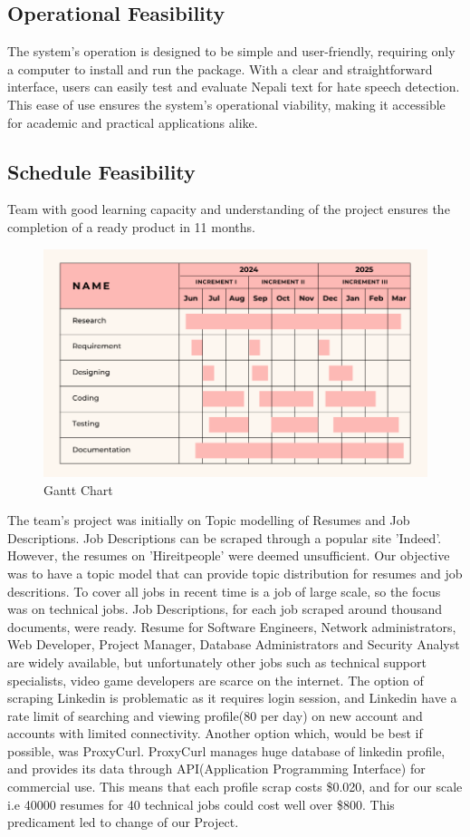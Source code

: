 \subsection{Operational Feasibility}
The system's operation is designed to be simple and user-friendly, requiring only a computer to install and run the package. With a clear and straightforward interface, users can easily test and evaluate Nepali text for hate speech detection. This ease of use ensures the system's operational viability, making it accessible for academic and practical applications alike.
\subsection{Schedule Feasibility}
Team with good learning capacity and understanding of the project ensures the completion of a ready product in 11 months.
\begin{figure}[h]
    \centering
    \includegraphics[scale=0.5]{images/gantt.png}
    \caption{Gantt Chart}
\end{figure}

The team's project was initially on Topic modelling of Resumes and Job Descriptions. Job Descriptions can be scraped through a popular site 'Indeed'. However, the resumes on 'Hireitpeople' were deemed unsufficient. Our objective was to have a topic model that can provide topic distribution for resumes and job descritions. To cover all jobs in recent time is a job of large scale, so the focus was on technical jobs. Job Descriptions, for each job scraped around thousand documents, were ready. Resume for Software Engineers, Network administrators, Web Developer, Project Manager, Database Administrators and Security Analyst are widely available, but unfortunately other jobs such as technical support specialists, video game developers are scarce on the internet. The option of scraping Linkedin is problematic as it requires login session, and Linkedin have a rate limit of searching and viewing profile(80 per day) on new account and accounts with limited connectivity. Another option which, would be best if possible, was ProxyCurl. ProxyCurl manages huge database of linkedin profile, and provides its data through API(Application Programming Interface) for commercial use. This means that each profile scrap costs \$0.020, and for our scale i.e 40000 resumes for 40 technical jobs could cost well over \$800. This predicament led to change of our Project.


